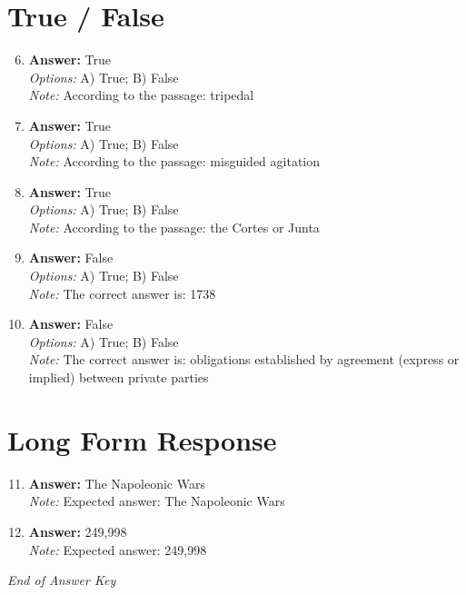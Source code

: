 \documentclass[12pt]{article}
\begin{document}
\section*{True / False}
\begin{enumerate}[label=\arabic*.]
\setcounter{enumi}{5}
\item \textbf{Answer:} True
\\ \textit{Options:} A) True; B) False
\\ \textit{Note:} According to the passage: tripedal
\item \textbf{Answer:} True
\\ \textit{Options:} A) True; B) False
\\ \textit{Note:} According to the passage: misguided agitation
\item \textbf{Answer:} True
\\ \textit{Options:} A) True; B) False
\\ \textit{Note:} According to the passage: the Cortes or Junta
\item \textbf{Answer:} False
\\ \textit{Options:} A) True; B) False
\\ \textit{Note:} The correct answer is: 1738
\item \textbf{Answer:} False
\\ \textit{Options:} A) True; B) False
\\ \textit{Note:} The correct answer is: obligations established by agreement (express or implied) between private parties
\end{enumerate}

\section*{Long Form Response}
\begin{enumerate}[label=\arabic*.]
\setcounter{enumi}{10}
\item \textbf{Answer:} The Napoleonic Wars
\\ \textit{Note:} Expected answer: The Napoleonic Wars
\item \textbf{Answer:} 249,998
\\ \textit{Note:} Expected answer: 249,998
\end{enumerate}

\vfill
\noindent\textit{End of Answer Key}
\end{document}

